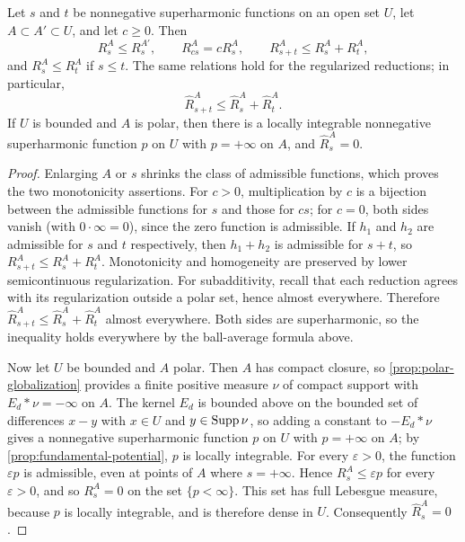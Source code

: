 \begin{proposition}\label{prop:reduction-order}
Let $s$ and $t$ be nonnegative superharmonic functions on an open set $U$, let $A\subset A'\subset U$, and let $c\geq0$. Then
\[
 R_s^A\leq R_s^{A'},\qquad R_{cs}^A=cR_s^A,\qquad R_{s+t}^A\leq R_s^A+R_t^A,
\]
and $R_s^A\leq R_t^A$ if $s\leq t$. The same relations hold for the regularized reductions; in particular,
\[
 \widehat R_{s+t}^A\leq\widehat R_s^A+\widehat R_t^A.
\]
If $U$ is bounded and $A$ is polar, then there is a locally integrable nonnegative superharmonic function $p$ on $U$ with $p=+\infty$ on $A$, and $\widehat R_s^A=0$.
\end{proposition}
\begin{proof}
Enlarging $A$ or $s$ shrinks the class of admissible functions, which proves the two monotonicity assertions. For $c>0$, multiplication by $c$ is a bijection between the admissible functions for $s$ and those for $cs$; for $c=0$, both sides vanish (with $0\cdot\infty=0$), since the zero function is admissible. If $h_1$ and $h_2$ are admissible for $s$ and $t$ respectively, then $h_1+h_2$ is admissible for $s+t$, so $R_{s+t}^A\leq R_s^A+R_t^A$. Monotonicity and homogeneity are preserved by lower semicontinuous regularization. For subadditivity, recall that each reduction agrees with its regularization outside a polar set, hence almost everywhere. Therefore $\widehat R_{s+t}^A\leq\widehat R_s^A+\widehat R_t^A$ almost everywhere. Both sides are superharmonic, so the inequality holds everywhere by the ball-average formula above.

Now let $U$ be bounded and $A$ polar. Then $A$ has compact closure, so \cref{prop:polar-globalization} provides a finite positive measure $\nu$ of compact support with $E_d*\nu=-\infty$ on $A$. The kernel $E_d$ is bounded above on the bounded set of differences $x-y$ with $x\in U$ and $y\in\operatorname{Supp}\nu$, so adding a constant to $-E_d*\nu$ gives a nonnegative superharmonic function $p$ on $U$ with $p=+\infty$ on $A$; by \cref{prop:fundamental-potential}, $p$ is locally integrable. For every $\varepsilon>0$, the function $\varepsilon p$ is admissible, even at points of $A$ where $s=+\infty$. Hence $R_s^A\leq\varepsilon p$ for every $\varepsilon>0$, and so $R_s^A=0$ on the set $\{p<\infty\}$. This set has full Lebesgue measure, because $p$ is locally integrable, and is therefore dense in $U$. Consequently $\widehat R_s^A=0$.
\end{proof}

